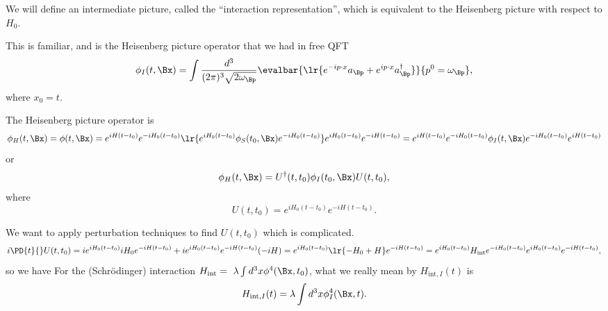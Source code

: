 We will define an intermediate picture, called the ``interaction representation'', which is equivalent to the Heisenberg picture with respect to \( H_0 \).

This is familiar, and is the Heisenberg picture operator that we had in free QFT
\begin{equation}\label{eqn:qftLecture13:700}
\phi_I(t, \Bx) =
\int \frac{d^3}{(2 \pi)^3 \sqrt{ 2 \omega_\Bp } }
\evalbar{
   \lr{
   e^{-i p \cdot x} a_\Bp
   + e^{i p \cdot x} a_\Bp^\dagger }
   }
{
p^0 = \omega_\Bp
},
\end{equation}
where \( x_0 = t \).

The Heisenberg picture operator is
\begin{equation}\label{eqn:qftLecture13:720}
\phi_H(t, \Bx)
=
\phi(t, \Bx)
=
e^{i H(t - t_0) }
e^{-i H_0(t - t_0) }
\lr{
   e^{i H_0(t - t_0) }
   \phi_S(t_0, \Bx)
   e^{-i H_0(t - t_0) }
}
e^{i H_0(t - t_0) }
e^{-i H(t - t_0) }
=
e^{i H(t - t_0) }
e^{-i H_0(t - t_0) }
\phi_I(t, \Bx)
e^{-i H_0(t - t_0) }
e^{i H(t - t_0) }
\end{equation}
or
\begin{equation}\label{eqn:qftLecture13:760}
\phi_H(t, \Bx)
=
U^\dagger(t, t_0)
\phi_I(t_0, \Bx)
U(t, t_0),
\end{equation}
where
\begin{equation}\label{eqn:qftLecture13:740}
U(t, t_0) =
e^{i H_0(t - t_0) }
e^{-i H(t - t_0) }.
\end{equation}

We want to apply perturbation techniques to find \( U(t, t_0) \) which is complicated.
\begin{equation}\label{eqn:qftLecture13:780}
i \PD{t}{} U(t, t_0)
=
i e^{i H_0(t - t_0) } i H_0
e^{-i H(t - t_0) }
+
i e^{i H_0(t - t_0) }
e^{-i H(t - t_0) } (-i H)
=
e^{i H_0(t - t_0) }
\lr{ -H_0 + H }
e^{-i H(t - t_0) }
=
e^{i H_0(t - t_0) }
H_{\text{int}}
e^{-i H_0(t - t_0) }
e^{i H_0(t - t_0) }
e^{-i H(t - t_0) },
\end{equation}
so we have
For the (Schr\"{o}dinger) interaction \( H_{\text{int}} = \
\lambda \int d^3 x \phi^4(\Bx, t_0)  \), what we really mean by
\( H_{\text{int}, I}(t) \) is
\begin{equation}\label{eqn:qftLecture13:820}
H_{\text{int}, I}(t) = \lambda \int d^3 x \phi_I^4(\Bx, t).
\end{equation}

